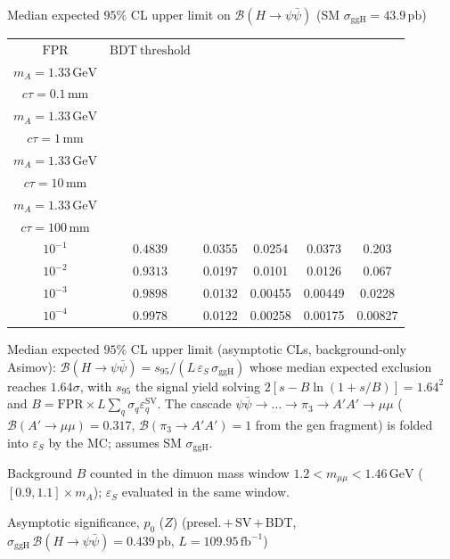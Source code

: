\documentclass[10pt,a4paper]{article}
\begin{document}
{\vspace{12pt}

Median expected $95\%$ CL upper limit on $\mathcal{B}(H\to\psi\bar{\psi})$ (SM $\sigma_{\mathrm{ggH}}=43.9\,\mathrm{pb}$)

\begin{tabular}{cccccc}
\toprule
$\mathrm{FPR}$ & $\mathrm{BDT\ threshold}$ & \shortstack{$m_{\pi}=4\,\mathrm{GeV}$\\$m_{A}=1.33\,\mathrm{GeV}$\\$c\tau=0.1\,\mathrm{mm}$} & \shortstack{$m_{\pi}=4\,\mathrm{GeV}$\\$m_{A}=1.33\,\mathrm{GeV}$\\$c\tau=1\,\mathrm{mm}$} & \shortstack{$m_{\pi}=4\,\mathrm{GeV}$\\$m_{A}=1.33\,\mathrm{GeV}$\\$c\tau=10\,\mathrm{mm}$} & \shortstack{$m_{\pi}=4\,\mathrm{GeV}$\\$m_{A}=1.33\,\mathrm{GeV}$\\$c\tau=100\,\mathrm{mm}$} \\
\midrule
$10^{-1}$ & $0.4839$ & 0.0355 & 0.0254 & 0.0373 & 0.203\\
$10^{-2}$ & $0.9313$ & 0.0197 & 0.0101 & 0.0126 & 0.067\\
$10^{-3}$ & $0.9898$ & 0.0132 & 0.00455 & 0.00449 & 0.0228\\
$10^{-4}$ & $0.9978$ & 0.0122 & 0.00258 & 0.00175 & 0.00827\\
\bottomrule
\end{tabular}

{\small Median expected $95\%$ CL upper limit (asymptotic CLs, background-only Asimov): $\mathcal{B}(H\to\psi\bar{\psi})=s_{95}/(L\,\varepsilon_S\,\sigma_{\mathrm{ggH}})$ whose median expected exclusion reaches $1.64\sigma$, with $s_{95}$ the signal yield solving $2[s-B\ln(1{+}s/B)]=1.64^2$ and $B=\mathrm{FPR}\times L\sum_q\sigma_q\varepsilon_q^{\mathrm{SV}}$. The cascade $\psi\bar{\psi}\to\ldots\to\pi_3\to A'A'\to\mu\mu$ ($\mathcal{B}(A'\to\mu\mu)=0.317$, $\mathcal{B}(\pi_3\to A'A')=1$ from the gen fragment) is folded into $\varepsilon_S$ by the MC; assumes SM $\sigma_{\mathrm{ggH}}$.}

{\small Background $B$ counted in the dimuon mass window $1.2<m_{\mu\mu}<1.46\,\mathrm{GeV}$ ($[0.9,1.1]\times m_A$); $\varepsilon_S$ evaluated in the same window.}

\vspace{12pt}

Asymptotic significance, $p_0$ ($Z$) (presel.\,$+$\,SV\,$+$\,BDT, $\sigma_{\mathrm{ggH}}\,\mathcal{B}(H\to\psi\bar{\psi})=0.439\,\mathrm{pb}$, $L=109.95\,\mathrm{fb}^{-1}$)

}
\end{document}
